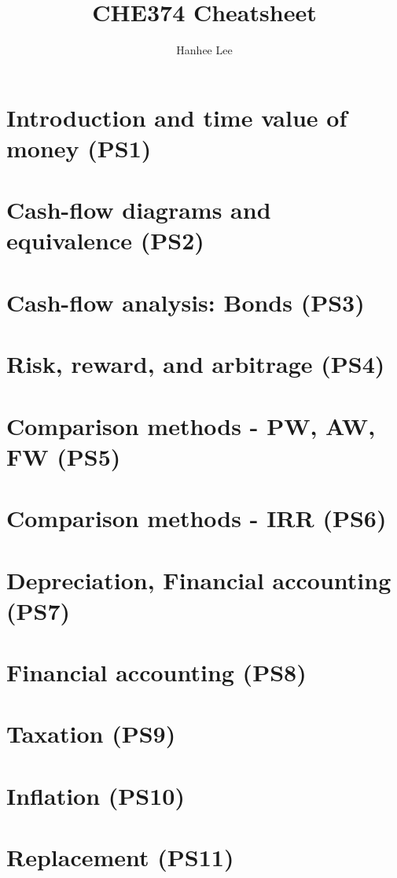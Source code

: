 \documentclass{article}
\title{CHE374 Cheatsheet}
\author{Hanhee Lee}
\begin{document}
\maketitle

\tableofcontents

\listoffigures

\listoftables

\section{Introduction and time value of money (PS1)}


\section{Cash-flow diagrams and equivalence (PS2)}


\section{Cash-flow analysis: Bonds (PS3)}


\section{Risk, reward, and arbitrage (PS4)} %


\section{Comparison methods - PW, AW, FW (PS5)}


\section{Comparison methods - IRR (PS6)}


\section{Depreciation, Financial accounting (PS7)}


\section{Financial accounting (PS8)}


\section{Taxation (PS9)}


\section{Inflation (PS10)}


\section{Replacement (PS11)}

\end{document}
